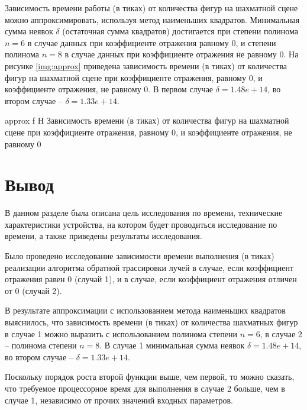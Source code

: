 Зависимость времени работы (в тиках) от количества фигур на шахматной сцене можно аппроксимировать, используя метод наименьших квадратов. Минимальная сумма неявок $\delta$ (остаточная сумма квадратов) достигается при степени полинома $n = 6$ в случае данных при коэффициенте отражения равному 0, и степени полинома $n = 8$ в случае данных при коэффициенте отражения не равному 0. На рисунке \ref{img:approx} приведена зависимость времени (в тиках) от количества фигур на шахматной сцене при коэффициенте отражения, равному 0, и коэффициенте отражения, не равному 0. В первом случае $\delta = 1.48e+14$, во втором случае -- $\delta = 1.33e+14$.

{approx} 
{f} 
{H} 
{\textwidth} 
{Зависимость времени (в тиках) от количества фигур на шахматной сцене при коэффициенте отражения, равному 0, и коэффициенте отражения, не равному 0}

\section*{Вывод}

В данном разделе была описана цель исследования по времени, технические характеристики устройства, на котором будет проводиться исследование по времени, а также приведены результаты исследования.

Было проведено исследование зависимости времени выполнения (в тиках) реализации алгоритма обратной трассировки лучей в случае, если коэффициент отражения равен 0 (случай 1), и в случае, если коэффициент отражения отличен от 0 (случай 2). 

В результате аппроксимации с использованием метода наименьших квадратов выяснилось, что зависимость времени (в тиках) от количества шахматных фигур в случае 1 можно выразить с использованием полинома степени $n = 6$, в случае 2 -- полинома степени $n = 8$. В случае 1 минимальная сумма неявок $\delta = 1.48e+14$, во втором случае -- $\delta = 1.33e+14$.

Поскольку порядок роста второй функции выше, чем первой, то можно сказать, что требуемое процессорное время для выполнения в случае 2 больше, чем в случае 1, независимо от прочих значений входных параметров.

